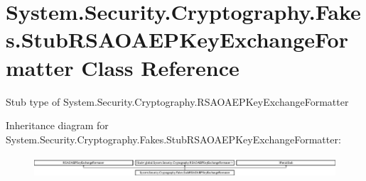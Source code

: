 \hypertarget{class_system_1_1_security_1_1_cryptography_1_1_fakes_1_1_stub_r_s_a_o_a_e_p_key_exchange_formatter}{\section{System.\-Security.\-Cryptography.\-Fakes.\-Stub\-R\-S\-A\-O\-A\-E\-P\-Key\-Exchange\-Formatter Class Reference}
\label{class_system_1_1_security_1_1_cryptography_1_1_fakes_1_1_stub_r_s_a_o_a_e_p_key_exchange_formatter}
}


Stub type of System.\-Security.\-Cryptography.\-R\-S\-A\-O\-A\-E\-P\-Key\-Exchange\-Formatter 


Inheritance diagram for System.\-Security.\-Cryptography.\-Fakes.\-Stub\-R\-S\-A\-O\-A\-E\-P\-Key\-Exchange\-Formatter\-:\begin{figure}[H]
\begin{center}
\leavevmode
\includegraphics[height=0.779402cm]{class_system_1_1_security_1_1_cryptography_1_1_fakes_1_1_stub_r_s_a_o_a_e_p_key_exchange_formatter}
\end{center}
\end{figure}
